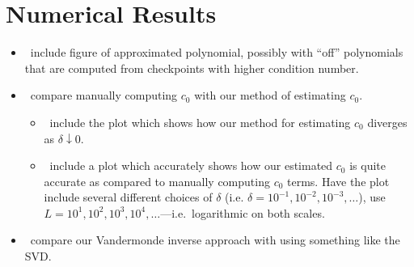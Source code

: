 \section{Numerical Results}

\begin{itemize}
\item \TODO\ include figure of approximated polynomial, possibly with
  ``off'' polynomials that are computed from checkpoints with higher
  condition number.
\item \TODO\ compare manually computing $c_0$ with our method of
  estimating $c_0$.
  \begin{itemize}
  \item \TODO\ include the plot which shows how our method for
    estimating $c_0$ diverges as $\delta \downarrow 0$.
  \item \TODO\ include a plot which accurately shows how our estimated
    $c_0$ is quite accurate as compared to manually computing $c_0$
    terms. Have the plot include several different choices of $\delta$
    (i.e. $\delta = 10^{-1}, 10^{-2}, 10^{-3}, \hdots$), use
    $L = 10^1, 10^2, 10^3, 10^4, \hdots$---i.e.\ logarithmic on both
    scales.
  \end{itemize}
\item \TODO\ compare our Vandermonde inverse approach with using
  something like the SVD.\@
\end{itemize}

